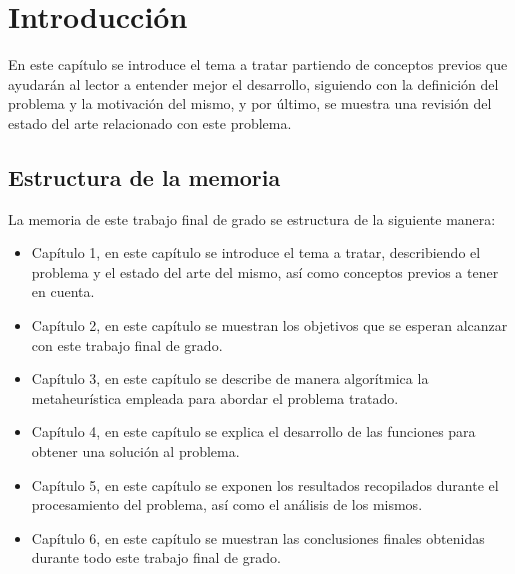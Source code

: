 
\chapter{Introducción} %

\label{Chapter1}


\newcommand{\keyword}[1]{\textbf{#1}}
\newcommand{\tabhead}[1]{\textbf{#1}}
\newcommand{\code}[1]{\texttt{#1}}
\newcommand{\file}[1]{\texttt{\bfseries#1}}
\newcommand{\option}[1]{\texttt{\itshape#1}}
\newcommand{\Mod}[1]{\ (\mathrm{mod}\ #1)}

En este capítulo se introduce el tema a tratar partiendo de conceptos previos que ayudarán al lector a entender mejor el desarrollo, siguiendo con la definición del problema y la motivación del mismo, y por último, se muestra una revisión del estado del arte relacionado con este problema.

\section{Estructura de la memoria}
La memoria de este trabajo final de grado se estructura de la siguiente manera:
\begin{itemize}
	\item Capítulo 1, en este capítulo se introduce el tema a tratar, describiendo el problema y el estado del arte del mismo, así como conceptos previos a tener en cuenta.
	\item Capítulo 2, en este capítulo se muestran los objetivos que se esperan alcanzar con este trabajo final de grado.
	\item Capítulo 3, en este capítulo se describe de manera algorítmica la metaheurística empleada para abordar el problema tratado.
	\item Capítulo 4, en este capítulo se explica el desarrollo de las funciones para obtener una solución al problema.
	\item Capítulo 5, en este capítulo se exponen los resultados recopilados durante el procesamiento del problema, así como el análisis de los mismos.
	\item Capítulo 6, en este capítulo se muestran las conclusiones finales obtenidas durante todo este trabajo final de grado.
\end{itemize}

